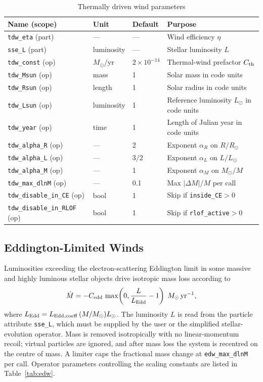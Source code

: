 \documentclass[11pt]{article}
\begin{document}
\begin{table}[h]
\centering\footnotesize
\caption{Thermally driven wind parameters}
\label{tab:tdw}
\begin{tabular}{@{}llll@{}}
\toprule
Name (scope) & Unit & Default & Purpose \\
\midrule
\texttt{tdw\_eta} (part) & — & — & Wind efficiency $\eta$\\
\texttt{sse\_L}   (part) & luminosity & — & Stellar luminosity $L$\\[0.2em]
\texttt{tdw\_const} (op) & $M_\odot$/yr & $2\times10^{-14}$ & Thermal-wind prefactor $C_{\rm th}$\\
\texttt{tdw\_Msun}  (op) & mass & 1 & Solar mass in code units\\
\texttt{tdw\_Rsun}  (op) & length & 1 & Solar radius in code units\\
\texttt{tdw\_Lsun}  (op) & luminosity & 1 & Reference luminosity $L_\odot$ in code units\\
\texttt{tdw\_year}  (op) & time & 1 & Length of Julian year in code units\\
\texttt{tdw\_alpha\_R} (op) & — & 2 & Exponent $\alpha_R$ on $R/R_\odot$\\
\texttt{tdw\_alpha\_L} (op) & — & $3/2$ & Exponent $\alpha_L$ on $L/L_\odot$\\
\texttt{tdw\_alpha\_M} (op) & — & 1 & Exponent $\alpha_M$ on $M_\odot/M$\\
\texttt{tdw\_max\_dlnM} (op) & — & 0.1 & Max $|\Delta M|/M$ per call\\
\texttt{tdw\_disable\_in\_CE} (op) & bool & 1 & Skip if \texttt{inside\_CE}$>0$\\
\texttt{tdw\_disable\_in\_RLOF} (op) & bool & 1 & Skip if \texttt{rlof\_active}$>0$\\
\bottomrule
\end{tabular}
\end{table}

\subsection{Eddington-Limited Winds}
\label{sec:edw}

Luminosities exceeding the electron-scattering Eddington limit in some massive and highly luminous stellar objects drive isotropic
mass loss according to
\[
\dot M = -C_{\rm edd}\,\max\!\left(0,\frac{L}{L_{\rm Edd}}-1\right)
\;M_\odot\,\mathrm{yr}^{-1},
\]
where $L_{\rm Edd} = L_{\rm Edd,coeff}\,(M/M_\odot)L_\odot$. The luminosity $L$
is read from the particle attribute \texttt{sse\_L}, which must be supplied
by the user or the simplified stellar-evolution operator. Mass is removed
isotropically with no linear-momentum recoil; virtual particles are ignored,
and after mass loss the system is recentred on the centre of mass. A limiter
caps the fractional mass change at \texttt{edw\_max\_dlnM} per call. Operator
parameters controlling the scaling constants are listed in
Table~\ref{tab:edw}.
\end{document}
